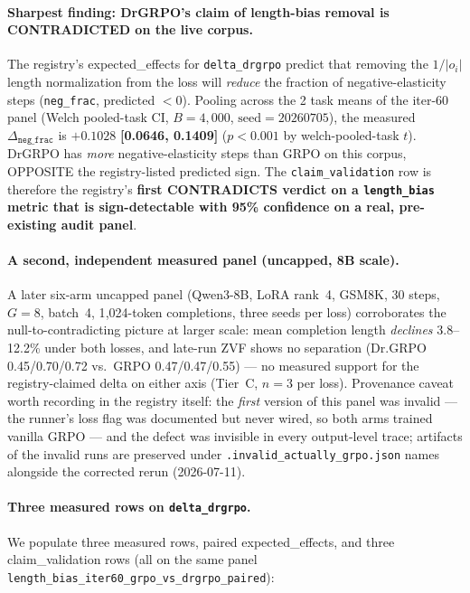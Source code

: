 \documentclass{article}
\begin{document}
\paragraph{Sharpest finding: DrGRPO's claim of length-bias removal is
CONTRADICTED on the live corpus.}
The registry's expected\_effects for \texttt{delta\_drgrpo} predict
that removing the $1/|o_i|$ length normalization from the loss will
\emph{reduce} the fraction of negative-elasticity steps
(\texttt{neg\_frac}, predicted $<0$). Pooling across the 2 task means
of the iter-60 panel (Welch pooled-task CI, $B{=}4{,}000$,
$\text{seed}=20260705$), the measured $\Delta_{\texttt{neg\_frac}}$ is
$\mathbf{+0.1028}$ \textbf{[0.0646, 0.1409]} ($p<0.001$ by
welch-pooled-task $t$). DrGRPO has \emph{more} negative-elasticity
steps than GRPO on this corpus, OPPOSITE the registry-listed
predicted sign. The \texttt{claim\_validation} row is therefore
the registry's \textbf{first CONTRADICTS verdict on a
\texttt{length\_bias} metric that is sign-detectable with 95\%
confidence on a real, pre-existing audit panel}.

\paragraph{A second, independent measured panel (uncapped, 8B scale).}
A later six-arm uncapped panel (Qwen3-8B, LoRA rank~4, GSM8K, 30 steps,
$G{=}8$, batch~4, 1{,}024-token completions, three seeds per loss)
corroborates the null-to-contradicting picture at larger scale: mean
completion length \emph{declines} 3.8--12.2\% under both losses, and
late-run ZVF shows no separation (Dr.GRPO 0.45/0.70/0.72 vs.\ GRPO
0.47/0.47/0.55) --- no measured support for the registry-claimed delta
on either axis (Tier~C, $n{=}3$ per loss). Provenance caveat worth
recording in the registry itself: the \emph{first} version of this panel
was invalid --- the runner's loss flag was documented but never wired,
so both arms trained vanilla GRPO --- and the defect was invisible in
every output-level trace; artifacts of the invalid runs are preserved
under \texttt{.invalid\_actually\_grpo.json} names alongside the
corrected rerun (2026-07-11).

\paragraph{Three measured rows on \texttt{delta\_drgrpo}.}
We populate three measured rows, paired expected\_effects, and three
claim\_validation rows (all on the same panel
\texttt{length\_bias\_iter60\_grpo\_vs\_drgrpo\_paired}):
\end{document}
